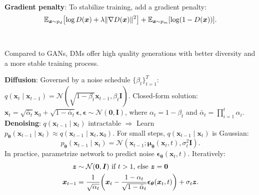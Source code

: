 \documentclass{article}
\newcommand{\lft}{\mathopen{}\mathclose\bgroup\left}
\newcommand{\rgt}{\aftergroup\egroup\right}
\newcommand{\E}{\mathbb{E}}
\renewcommand{\vec}[1]{\bm{#1}}
\newcommand{\mat}[1]{\bm{#1}}
\newenvironment{topic}[1]
{\textbf{\sffamily \colorbox{black}{\rlap{\textbf{\textcolor{white}{#1}}}\hspace{\linewidth}\hspace{-2\fboxsep}}} \\ \vspace{0.2cm}}
{}
\begin{document}
\begin{multicols*}{2}
\begin{topic}{Generative adversarial network}
        \textbf{Gradient penalty}: To stabilize training, add a gradient penalty: \[
            \E_{\vec{x} \sim p_d} \lft[ \log D(\vec{x}) + \lambda \| \nabla D(\vec{x}) \|^2 \rgt] + \E_{\vec{x} \sim p_m} [\log (1 - D(\vec{x}))].
        \]

    \end{topic}

    \begin{topic}{Diffusion models}

        Compared to GANs, DMs offer high quality generations with better diversity and a more stable
        training process.

        \textbf{Diffusion}: Governed by a noise schedule $\{ \beta_t \}_{t=1}^T$: $q(\vec{x}_t \mid \vec{x}_{t-1}) = \mathcal{N}(\sqrt{1 - \beta_t} \vec{x}_{t-1}, \beta_t \mat{I})$.
        Closed-form solution: $\vec{x}_t = \sqrt{\bar{\alpha}_t} \vec{x}_0 + \sqrt{1 - \bar{\alpha}_t} \vec{\epsilon}, \vec{\epsilon} \sim \mathcal{N}(\vec{0}, \mat{I})$,
        where $\alpha_t = 1 - \beta_t$ and $\bar{\alpha}_t = \prod_{i=1}^t \alpha_i$. \\
        \textbf{Denoising}: $q(\vec{x}_{t-1} \mid \vec{x}_t)$ intractable $\Rightarrow$ Learn $p_{\vec{\theta}}(\vec{x}_{t-1} \mid \vec{x}_t) \approx
            q(\vec{x}_{t-1} \mid \vec{x}_t, \vec{x}_0)$. For small steps, $q(\vec{x}_{t-1} \mid \vec{x}_t)$
        is Gaussian: \[
            p_{\vec{\theta}}(\vec{x}_{t-1} \mid \vec{x}_t) = \mathcal{N}(\vec{x}_{t-1} ; \vec{\mu}_{\vec{\theta}}(\vec{x}_t, t), \sigma_t^2 \mat{I}).
        \]
        In practice, parametrize network to predict noise $\vec{\epsilon}_{\vec{\theta}}(\vec{x}_t, t)$.
        Iteratively:
        \begin{align*}
            \vec{z}       & \sim \mathcal{N}(\vec{0}, \mat{I}) \text{ if $t > 1$, else $\vec{z} = \vec{0}$}                                                                                    \\
            \vec{x}_{t-1} & = \frac{1}{\sqrt{\alpha_t}} \lft( \vec{x}_t - \frac{1 - \alpha_t}{\sqrt{1 - \bar{\alpha}_t}} \vec{\epsilon}_{\vec{\theta}}(\vec{x}_t, t) \rgt) + \sigma_t \vec{z}.
        \end{align*}


\end{topic}
\end{multicols*}
\end{document}
